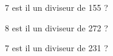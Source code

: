 \begin{multicols}{3}
7 est il un diviseur de 155 ?
\columnbreak

8 est il un diviseur de 272 ?
\columnbreak

7 est il un diviseur de 231 ?
\columnbreak

\end{multicols}